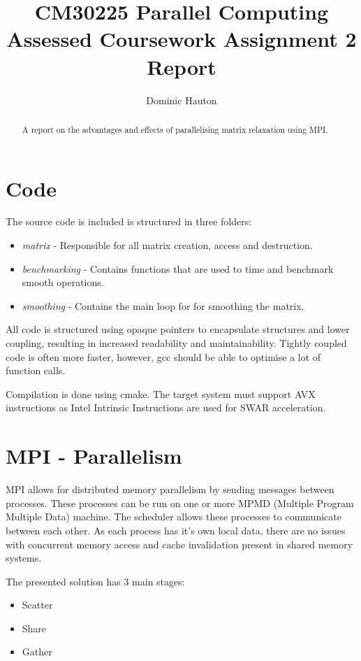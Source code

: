 \documentclass[a4paper,10pt]{report}
\title{CM30225 Parallel Computing\\Assessed Coursework Assignment 2\\Report}
\author{Dominic Hauton}
\begin{document}
\maketitle

\begin{abstract}
A report on the advantages and effects of parallelising matrix relaxation using MPI.
\end{abstract}

\section{Code}

The source code is included is structured in three folders:
\begin{itemize}
 \item \emph{matrix} - Responsible for all matrix creation, access and destruction.
 \item \emph{benchmarking} - Contains functions that are used to time and benchmark smooth operations.
 \item \emph{smoothing} - Contains the main loop for for smoothing the matrix.
\end{itemize}
All code is structured using opaque pointers to encapsulate structures and lower coupling, resulting in increased readability and maintainability. Tightly coupled code is often more faster, however, gcc should be able to optimise a lot of function calls.\par
Compilation is done using cmake. The target system must support AVX instructions as Intel Intrinsic Instructions are used for SWAR acceleration.

\section{MPI - Parallelism}

MPI allows for distributed memory parallelism by sending messages between processes. These processes can be run on one or more MPMD (Multiple Program Multiple Data) machine. The scheduler allows these processes to communicate between each other. As each process has it's own local data, there are no issues with concurrent memory access and cache invalidation present in shared memory systems.\par
The presented solution has 3 main stages:
\begin{itemize}
 \item Scatter
 \item Share
 \item Gather
\end{itemize}\par
\end{document}
